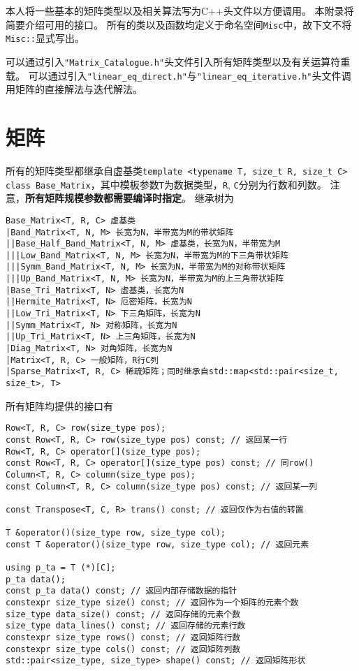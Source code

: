本人将一些基本的矩阵类型以及相关算法写为\textsf{C++}头文件以方便调用。
本附录将简要介绍可用的接口。
所有的类以及函数均定义于命名空间\texttt{Misc}中，故下文不将\texttt{Misc::}显式写出。

可以通过引入\texttt{"Matrix\_Catalogue.h"}头文件引入所有矩阵类型以及有关运算符重载。
可以通过引入\texttt{"linear\_eq\_direct.h"}与\texttt{"linear\_eq\_iterative.h"}头文件调用矩阵的直接解法与迭代解法。

\section{矩阵}
所有的矩阵类型都继承自虚基类\texttt{template <typename T, size\_t R, size\_t C> class Base\_Matrix}，其中模板参数\texttt{T}为数据类型，\texttt{R}, \texttt{C}分别为行数和列数。
注意，\textbf{所有矩阵规模参数都需要编译时指定}。
继承树为
{
\small
\begin{verbatim}
Base_Matrix<T, R, C> 虚基类
|Band_Matrix<T, N, M> 长宽为N，半带宽为M的带状矩阵
||Base_Half_Band_Matrix<T, N, M> 虚基类，长宽为N，半带宽为M
|||Low_Band_Matrix<T, N, M> 长宽为N，半带宽为M的下三角带状矩阵
|||Symm_Band_Matrix<T, N, M> 长宽为N，半带宽为M的对称带状矩阵
|||Up_Band_Matrix<T, N, M> 长宽为N，半带宽为M的上三角带状矩阵
|Base_Tri_Matrix<T, N> 虚基类，长宽为N
||Hermite_Matrix<T, N> 厄密矩阵，长宽为N
||Low_Tri_Matrix<T, N> 下三角矩阵，长宽为N
||Symm_Matrix<T, N> 对称矩阵，长宽为N
||Up_Tri_Matrix<T, N> 上三角矩阵，长宽为N
|Diag_Matrix<T, N> 对角矩阵，长宽为N
|Matrix<T, R, C> 一般矩阵，R行C列
|Sparse_Matrix<T, R, C> 稀疏矩阵；同时继承自std::map<std::pair<size_t, size_t>, T>
\end{verbatim}
}

所有矩阵均提供的接口有
{
\linespread{1.0}
\begin{lstlisting}
Row<T, R, C> row(size_type pos);
const Row<T, R, C> row(size_type pos) const; // 返回某一行
Row<T, R, C> operator[](size_type pos);
const Row<T, R, C> operator[](size_type pos) const; // 同row()
Column<T, R, C> column(size_type pos);
const Column<T, R, C> column(size_type pos) const; // 返回某一列

const Transpose<T, C, R> trans() const; // 返回仅作为右值的转置

T &operator()(size_type row, size_type col);
const T &operator()(size_type row, size_type col); // 返回元素

using p_ta = T (*)[C];
p_ta data();
const p_ta data() const; // 返回内部存储数据的指针
constexpr size_type size() const; // 返回作为一个矩阵的元素个数
size_type data_size() const; // 返回存储的元素个数
size_type data_lines() const; // 返回存储的元素行数
constexpr size_type rows() const; // 返回矩阵行数
constexpr size_type cols() const; // 返回矩阵列数
std::pair<size_type, size_type> shape() const; // 返回矩阵形状
\end{lstlisting}
}


